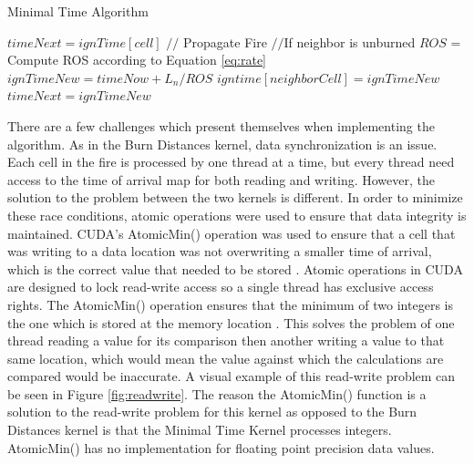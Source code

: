 \begin{algorithm}[H]
  \caption{Minimal Time Algorithm}
  \label{alg:MT}
  \begin{algorithmic}
  \STATE $timeNext = ignTime[cell]$
  \STATE $//$ Propagate Fire
  \STATE $//$If neighbor is unburned
  \STATE $ROS$ = Compute ROS according to Equation \ref{eq:rate}
  \STATE $ignTimeNew = timeNow + L_n / ROS$
  \STATE $igntime[neighborCell] = ignTimeNew$
  \ENDIF
  \STATE $timeNext = ignTimeNew$
  \ENDIF
  \ENDIF
  \ENDFOR
  \ENDIF
  \ENDFOR
  \end{algorithmic}
\end{algorithm}

There are a few challenges which present themselves when implementing the algorithm. As in the Burn Distances kernel, data synchronization is an issue. Each cell in the fire is processed by one thread at a time, but every thread need access to the time of arrival map for both reading and writing. However, the solution to the problem between the two kernels is different. In order to minimize these race conditions, atomic operations were used to ensure that data integrity is maintained. CUDA's AtomicMin() operation was used to ensure that a cell that was writing to a data location was not overwriting a smaller time of arrival, which is the correct value that needed to be stored \cite{cuda}. Atomic operations in CUDA are designed to lock read-write access so a single thread has exclusive access rights. The AtomicMin() operation ensures that the minimum of two integers is the one which is stored at the memory location \cite{cudabyexample}. This solves the problem of one thread reading a value for its comparison then another writing a value to that same location, which would mean the value against which the calculations are compared would be inaccurate. A visual example of this read-write problem can be seen in Figure \ref{fig:readwrite}. The reason the AtomicMin() function is a solution to the read-write problem for this kernel as opposed to the Burn Distances kernel is that the Minimal Time Kernel processes integers. AtomicMin() has no implementation for floating point precision data values. 

